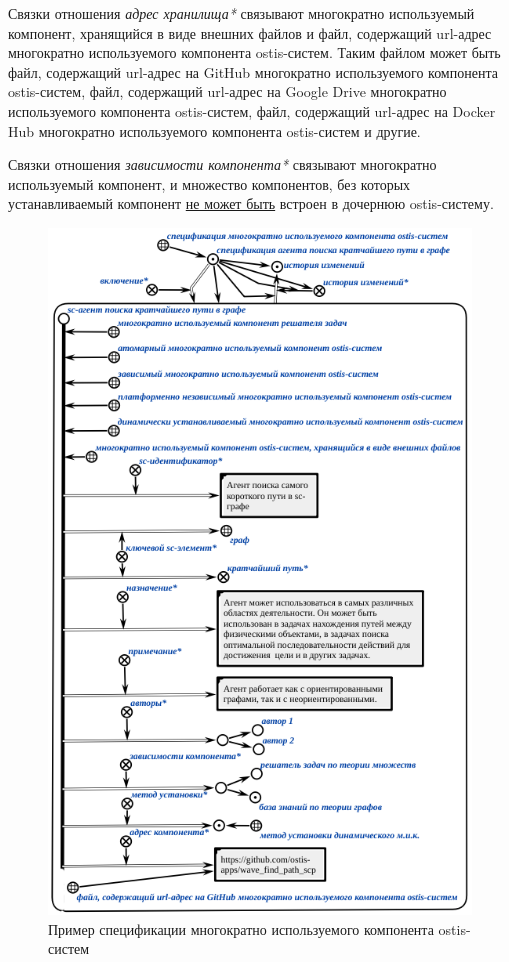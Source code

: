 Связки отношения \textit{адрес хранилища*} связывают многократно используемый компонент, хранящийся в виде внешних файлов и файл, содержащий url-адрес многократно используемого компонента ostis-систем. Таким файлом может быть файл, содержащий url-адрес на GitHub многократно используемого компонента ostis-систем, файл, содержащий url-адрес на Google Drive многократно используемого компонента ostis-систем, файл, содержащий url-адрес на Docker Hub многократно используемого компонента ostis-систем и другие.

Связки отношения \textit{зависимости компонента*} связывают многократно используемый компонент, и множество компонентов, без которых устанавливаемый компонент \underline{не может быть} встроен в дочернюю ostis-систему.

\begin{figure}[H]
	\includegraphics[scale=0.6]{author/part5/figures/component_specification_example.png}
	\caption{Пример спецификации многократно используемого компонента ostis-систем}
	\label{fig:component_specification_example}
\end{figure}


